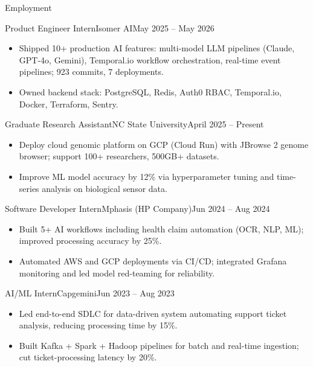 \documentclass[]{mcdowellcv}
\begin{document}
\makeheader

\begin{cvsection}{Employment}
  \begin{cvsubsection}{Product Engineer Intern}{Isomer AI}{May 2025 -- May 2026}
    \begin{itemize}
      \item Shipped 10+ production AI features: multi-model LLM pipelines (Claude, GPT-4o, Gemini), Temporal.io workflow orchestration, real-time event pipelines; 923 commits, 7 deployments.
      \item Owned backend stack: PostgreSQL, Redis, Auth0 RBAC, Temporal.io, Docker, Terraform, Sentry.
    \end{itemize}
    \vspace{-1.5pt}
  \end{cvsubsection}

  \begin{cvsubsection}{Graduate Research Assistant}{NC State University}{April 2025 -- Present}
    \begin{itemize}
      \item Deploy cloud genomic platform on GCP (Cloud Run) with JBrowse 2 genome browser; support 100+ researchers, 500GB+ datasets.
      \item Improve ML model accuracy by 12\% via hyperparameter tuning and time-series analysis on biological sensor data.
    \end{itemize}
    \vspace{-1.5pt}
  \end{cvsubsection}

  \begin{cvsubsection}{Software Developer Intern}{Mphasis (HP Company)}{Jun 2024 -- Aug 2024}
    \begin{itemize}
      \item Built 5+ AI workflows including health claim automation (OCR, NLP, ML); improved processing accuracy by 25\%.
      \item Automated AWS and GCP deployments via CI/CD; integrated Grafana monitoring and led model red-teaming for reliability.
    \end{itemize}
    \vspace{-1.5pt}
  \end{cvsubsection}

  \begin{cvsubsection}{AI/ML Intern}{Capgemini}{Jun 2023 -- Aug 2023}
    \begin{itemize}
      \item Led end-to-end SDLC for data-driven system automating support ticket analysis, reducing processing time by 15\%.
      \item Built Kafka + Spark + Hadoop pipelines for batch and real-time ingestion; cut ticket-processing latency by 20\%.
    \end{itemize}
    \vspace{-1.5pt}
  \end{cvsubsection}
\end{cvsection}
\end{document}
